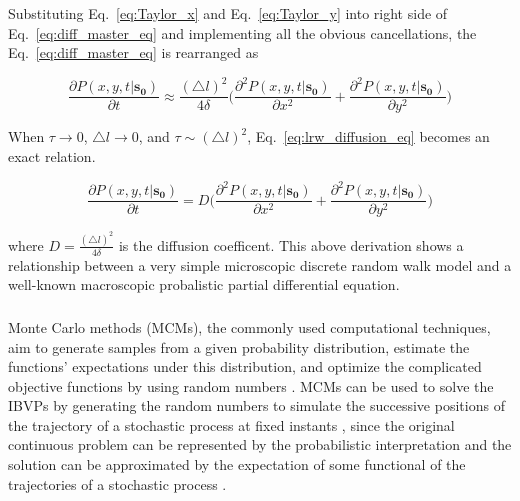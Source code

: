 Substituting Eq.~\ref{eq:Taylor_x} and Eq.~\ref{eq:Taylor_y} into
right side of Eq.~\ref{eq:diff_master_eq} and implementing
all the obvious cancellations, the Eq.~\ref{eq:diff_master_eq} is
rearranged as

\begin{equation}\label{eq:lrw_diffusion_eq}
  \frac{\partial P(x, y, t | \bm{s_0})}{\partial t} \approx
  \frac{(\triangle l)^2}{4 \delta} \Big( \frac{\partial ^2 P(x, y, t |
    \bm{s_0})}{\partial x^2} + \frac{\partial ^2 P(x, y, t |
    \bm{s_0})}{\partial y^2}\Big)
\end{equation}

When $\tau \rightarrow 0$, $\triangle l \rightarrow 0$, and $\tau \sim (\triangle l)^2$, Eq.~\ref{eq:lrw_diffusion_eq} becomes an exact
relation.

\begin{equation}\label{eq:limit_lrw_diffusion_eq}
  \frac{\partial P(x, y, t | \bm{s_0})}{\partial t} = D \Big( \frac{\partial ^2 P(x, y, t | \bm{s_0})}{\partial x^2} + \frac{\partial ^2 P(x, y, t |\bm{s_0})}{\partial y^2}\Big)
\end{equation}

where $D = \frac{(\triangle l)^2}{4 \delta}$ is the diffusion
coefficent. This above derivation shows a relationship between a very
simple microscopic discrete random walk model and a well-known
macroscopic probalistic partial differential equation.


\subsubsection{}


Monte Carlo methods (MCMs), the commonly used computational
techniques, aim to generate samples from a given probability
distribution, estimate the functions' expectations under this
distribution, and optimize the complicated objective functions by
using random numbers \cite{kroese2014monte}
\cite{rubinstein2016simulation}. MCMs can be used to solve the IBVPs
by generating the random numbers to simulate the successive positions
of the trajectory of a stochastic process at fixed instants
\cite{kronberg1976solution}\cite{king1951monte}, since the original
continuous problem can be represented by the probabilistic
interpretation and the solution can be approximated by the expectation
of some functional of the trajectories of a stochastic process
\cite{grebenkov2014efficient}\cite{sabelfeld2013random}.


